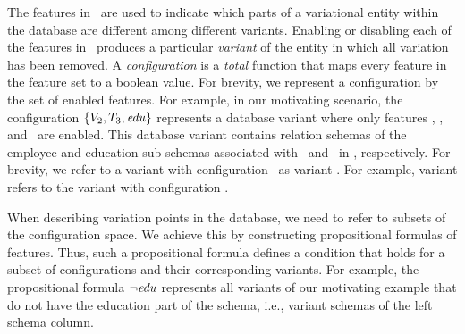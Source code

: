 The features in \fSet\ are used to indicate which parts 
of a variational entity within the database are different 
among different variants. Enabling or disabling each of the 
features in \fSet\ produces a particular \emph{variant} 
of the entity in which all variation has been removed. 
A \emph{configuration} is a \emph{total} function
that maps every feature in the feature set to a boolean value.
For brevity, we represent a configuration  by the set of enabled features.
For example, in our motivating scenario, the configuration \ensuremath{
\setDef {\vTwo,\tThree,\edu}
}
represents a database variant where only features \vTwo, \tThree, and \edu\ are enabled.
This database variant contains relation schemas of the
employee and education sub-schemas associated with \vTwo\ and
\tThree\ in , respectively.
For brevity, we refer to a variant with configuration \config\ as variant \config.
For example, variant \setDef {\vTwo,\tThree,\edu} refers to the variant
with configuration \setDef {\vTwo,\tThree,\edu}.

When describing variation points in the database, we need to 
refer to subsets of the configuration space. We achieve this by 
constructing propositional formulas of features.
Thus, 
such a propositional formula defines a condition that holds for 
a subset of configurations and their corresponding variants. 
%
%
For example,
the propositional formula $\neg \edu$ represents all variants of our
motivating example that do not 
have the education part of the schema, i.e., variant schemas of the 
left schema column. 

